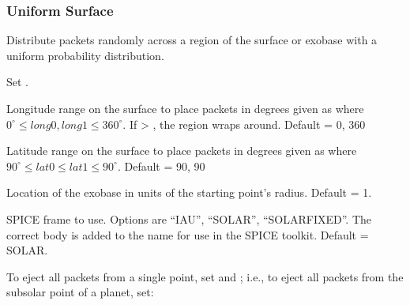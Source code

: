 \documentclass[letterpaper,10pt,english]{sphinxmanual}
\begin{document}
\subsubsection{Uniform Surface}
\label{\detokenize{nexoclom2/inputfiles:uniform-surface}}\label{\detokenize{nexoclom2/inputfiles:uniformspatdist}}
\sphinxAtStartPar
Distribute packets randomly across a region of the surface or exobase with
a uniform probability distribution.
\begin{description}
\sphinxAtStartPar
Set .

\sphinxAtStartPar
Longitude range on the surface to place packets in degrees given as
 where \(0^\circ \leq long0,long1 \leq 360^\circ\).
If  \textgreater{} , the region wraps around. Default = 0, 360

\sphinxAtStartPar
Latitude range on the surface to place packets in degrees given as
 where \(90^\circ \leq lat0 \leq lat1 \leq 90^\circ\).
Default = \sphinxhyphen{}90, 90

\sphinxAtStartPar
Location of the exobase in units of the starting point’s radius.
Default = 1.

\sphinxAtStartPar
SPICE frame to use. Options are “IAU”, “SOLAR”, “SOLARFIXED”. The correct
body is added to the name for use in the SPICE toolkit.
Default = SOLAR.

\end{description}

\sphinxAtStartPar
To eject all packets from a single point, set  and
; i.e., to eject all packets from the sub\sphinxhyphen{}solar point of a planet,
set:

\begin{sphinxVerbatim}[commandchars=\\\{\}]
  
  
  
\end{sphinxVerbatim}
\end{document}
